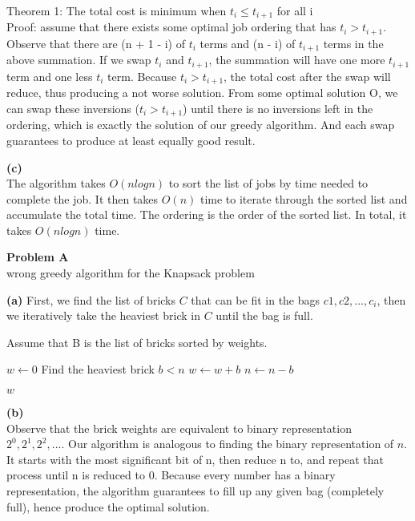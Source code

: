 \documentclass[12pt,article]{article}
\newenvironment{problem}[2][Problem]
    { \begin{mdframed}[backgroundcolor=gray!20] \textbf{#1 #2} \\}
    {  \end{mdframed}}
\begin{document}
Theorem 1: The total cost is minimum when $t_i \leq t_{i+1}$ for all i \\
Proof: assume that there exists some optimal job ordering that has $t_i > t_{i+1}$. Observe that there are (n + 1 - i) of $t_i$ terms and (n - i) of $t_{i+1}$ terms in the above summation. If we swap $t_i$ and $t_{i+1}$, the summation will have one more $t_{i+1}$ term and one less $t_i$ term. Because $t_i > t_{i+1}$, the total cost after the swap will reduce, thus producing a not worse solution. From some optimal solution O, we can swap these inversions ($t_{i} > t_{i+1}$) until there is no inversions left in the ordering, which is exactly the solution of our greedy algorithm. And each swap guarantees to produce at least equally good result.

\textbf{(c)} \\
The algorithm takes $O(nlogn)$ to sort the list of jobs by time needed to complete the job. It then takes $O(n)$ time to iterate through the sorted list and accumulate the total time. The ordering is the order of the sorted list. In total, it takes $O(nlogn)$ time.

\newpage
\begin{problem}{2} 
A wrong greedy algorithm for the Knapsack problem 
\end{problem}

\textbf{(a)}
First, we find the list of bricks $C$ that can be fit in the bags $c1, c2, ..., c_{i}$, then we iteratively take the heaviest brick in $C$ until the bag is full.

Assume that B is the list of bricks sorted by weights.
\begin{algorithm}
\caption{$A(B,n)$}\label{alg:q2}
\begin{algorithmic}
    \State $w \gets 0$
        \State Find the heaviest brick $b < n$
        \State $w \gets w + b$
        \State $n \gets n - b$
    \EndWhile

    \Return $w$
\end{algorithmic}
\end{algorithm}

\textbf{(b)} \\
Observe that the brick weights are equivalent to binary representation $2^0,2^1,2^2,...$. Our algorithm is analogous to finding the binary representation of $n$. It starts with the most significant bit of n, then reduce n to, and repeat that process until n is reduced to 0. Because every number has a binary representation, the algorithm guarantees to fill up any given bag (completely full), hence produce the optimal solution.
\end{document}
